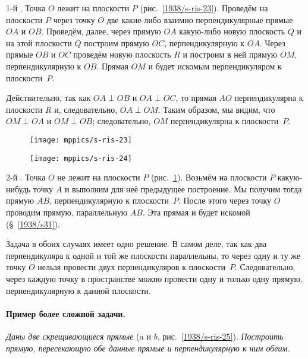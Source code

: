 1-й .
Точка $O$ лежит на плоскости $P$ (рис.~\ref{1938/s-ris-23}).
Проведём на плоскости $P$ через точку $O$ две какие-либо взаимно перпендикулярные прямые $OA$ и $OB$.
Проведём, далее, через прямую $OA$ какую-либо новую плоскость $Q$ и на этой плоскости $Q$ построим прямую $OC$, перпендикулярную к $OA$.
Через прямые $OB$ и $OC$ проведём новую плоскость $R$ и построим в ней прямую $OM$, перпендикулярную к $OB$.
Прямая $OM$ и будет искомым перпендикуляром к плоскости~$P$.

Действительно, так как $OA \perp OB$ и $OA \perp OC$, то прямая $AO$ перпендикулярна к плоскости $R$ и, следовательно, $OA \perp OM$.
Таким образом, мы видим, что $OM\perp OA$ и $OM\perp OB$;
следовательно, $OM$ перпендикулярна к плоскости~$P$.

\begin{figure}[!ht]
\begin{minipage}{.48\textwidth}
\centering
\texttt{[image: mppics/s-ris-23]}
\end{minipage}
\hfill
\begin{minipage}{.48\textwidth}
\centering
\texttt{[image: mppics/s-ris-24]}
\end{minipage}

\medskip

\begin{minipage}{.48\textwidth}
\centering
\caption{}\label{1938/s-ris-23}
\end{minipage}
\hfill
\begin{minipage}{.48\textwidth}
\centering
\caption{}\label{1938/s-ris-24}
\end{minipage}
\vskip-4mm
\end{figure}

2-й \mbox{.}
Точка $O$ не лежит на плоскости $P$ (рис.~\ref{1938/s-ris-24}).
Возьмём на плоскости $P$ какую-нибудь точку $A$ и выполним для неё предыдущее построение.
Мы получим тогда прямую $AB$, перпендикулярную к плоскости~$P$.
После этого через точку $O$ проводим прямую, параллельную $AB$.
Эта прямая и будет искомой (§~\ref{1938/s31}).

\medskip

Задача в обоих случаях имеет одно решение.
В самом деле, так как два перпендикуляра к одной и той же плоскости параллельны, то через одну и ту же точку $O$ нельзя провести двух перпендикуляров к плоскости~$P$.
Следовательно, через каждую точку в пространстве можно провести одну и только одну прямую, перпендикулярную к данной плоскости.

\paragraph{Пример более сложной задачи.}\label{1938/s37}
\emph{Даны две скрещивающиеся прямые} ($a$ и $b$, рис.~\ref{1938/s-ris-25}).
\emph{Построить прямую, пересекающую обе данные прямые и перпендикулярную к ним обеим.}

